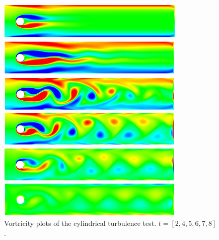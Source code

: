 \documentclass[lang=en,11pt,a4paper,bibend=bibtex]{elegantpaper}
\begin{document}
\begin{figure}[H]
    \centering
    \includegraphics[width=0.8\textwidth]{png/cy-2.png}

    \vspace{.9em}

    \includegraphics[width=0.8\textwidth]{png/cy-4.png}

    \vspace{.8em}

    \includegraphics[width=0.8\textwidth]{png/cy-5.png}

    \vspace{.8em}

    \includegraphics[width=0.8\textwidth]{png/cy-6.png}

    \vspace{.8em}

    \includegraphics[width=0.8\textwidth]{png/cy-7.png}

    \vspace{.8em}

    \includegraphics[width=0.8\textwidth]{png/cy-8.png}
    \caption{Vortricity plots of the cylindrical turbulence test. 
             $t=[2,4,5,6,7,8]$.}
\end{figure}
\end{document}
